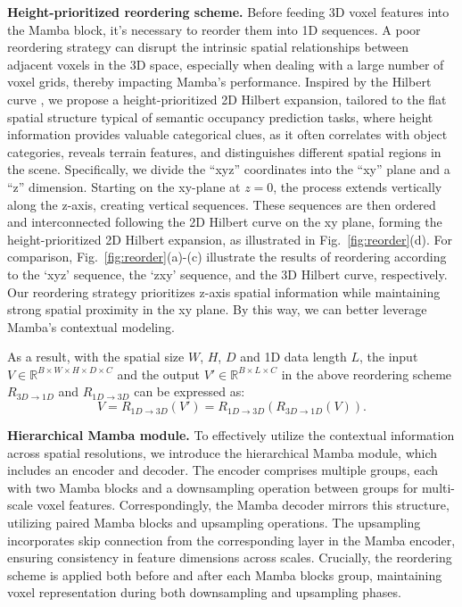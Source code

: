 \documentclass[10pt,twocolumn,letterpaper]{article}
\begin{document}
\textbf{Height-prioritized reordering scheme.}
Before feeding 3D voxel features into the Mamba block, it's necessary to reorder them into 1D sequences. A poor reordering strategy can disrupt the intrinsic spatial relationships between adjacent voxels in the 3D space, especially when dealing with a large number of voxel grids, thereby impacting Mamba's performance. Inspired by the Hilbert curve \cite{yimingli2022}, we propose a height-prioritized 2D Hilbert expansion, tailored to the flat spatial structure typical of semantic occupancy prediction tasks, where height information provides valuable categorical clues, as it often correlates with object categories, reveals terrain features, and distinguishes different spatial regions in the scene. Specifically, we divide the ``xyz'' coordinates into the ``xy'' plane and a ``z'' dimension. Starting on the xy-plane at $z=0$, the process extends vertically along the z-axis, creating vertical sequences. These sequences are then ordered and interconnected following the 2D Hilbert curve on the xy plane, forming the height-prioritized 2D Hilbert expansion, as illustrated in Fig.~\ref{fig:reorder}(d). For comparison, Fig.~\ref{fig:reorder}(a)-(c) illustrate the results of reordering according to the `xyz' sequence, the `zxy' sequence, and the 3D Hilbert curve, respectively. Our reordering strategy prioritizes z-axis spatial information while maintaining strong spatial proximity in the xy plane. By this way, we can better leverage Mamba's contextual modeling.

As a result, with the spatial size $W$, $H$, $D$ and 1D data length $L$, the input $V \in \mathbb{R}^{B \times W \times H \times D \times C}$ and the output $V' \in \mathbb{R}^{B \times L \times C}$ in the above reordering scheme $R_{3D \to 1D}$ and $R_{1D \to 3D}$ can be expressed as:
\begin{equation}
  V = R_{1D \to 3D}(V') = R_{1D \to 3D}(R_{3D \to 1D}(V)). \label{eq:reorder}
\end{equation}

\textbf{Hierarchical Mamba module.}
To effectively utilize the contextual information across spatial resolutions, we introduce the hierarchical Mamba module, which includes an encoder and decoder. The encoder comprises multiple groups, each with two Mamba blocks and a downsampling operation between groups for multi-scale voxel features. Correspondingly, the Mamba decoder mirrors this structure, utilizing paired Mamba blocks and upsampling operations. The upsampling incorporates skip connection from the corresponding layer in the Mamba encoder, ensuring consistency in feature dimensions across scales. Crucially, the reordering scheme is applied both before and after each Mamba blocks group, maintaining voxel representation during both downsampling and upsampling phases.
\end{document}
